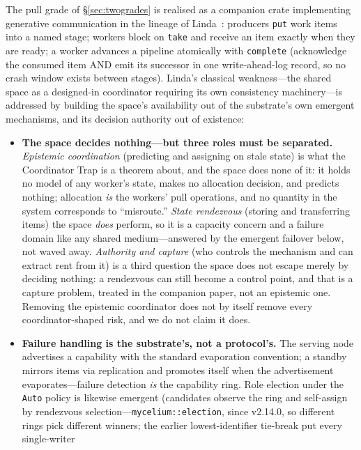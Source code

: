\documentclass[11pt]{article}
\theoremstyle{definition}
\theoremstyle{plain}
\theoremstyle{plain}
\begin{document}
The pull grade of \S\ref{sec:twogrades} is realised as a companion crate
implementing generative communication in the lineage of
Linda~\cite{gelernter1985}: producers \texttt{put} work items into a named
stage; workers block on \texttt{take} and receive an item exactly when
they are ready; a worker advances a pipeline atomically with
\texttt{complete} (acknowledge the consumed item AND emit its successor in
one write-ahead-log record, so no crash window exists between stages).
Linda's classical weakness---the shared space as a designed-in
coordinator requiring its own consistency machinery---is addressed by
building the space's availability out of the substrate's own emergent
mechanisms, and its decision authority out of existence:

\begin{itemize}
\item \textbf{The space decides nothing---but three roles must be
  separated.} \emph{Epistemic coordination} (predicting and assigning on stale
  state) is what the Coordinator Trap is a theorem about, and the space does none of
  it: it holds no model of any worker's state, makes no allocation decision, and
  predicts nothing; allocation \emph{is} the workers' pull operations, and no
  quantity in the system corresponds to ``misroute.'' \emph{State rendezvous}
  (storing and transferring items) the space \emph{does} perform, so it is a capacity
  concern and a failure domain like any shared medium---answered by the emergent
  failover below, not waved away. \emph{Authority and capture} (who controls the
  mechanism and can extract rent from it) is a third question the space does not
  escape merely by deciding nothing: a rendezvous can still become a control point,
  and that is a capture problem, treated in the companion paper, not an epistemic
  one. Removing the epistemic coordinator does not by itself remove every
  coordinator-shaped risk, and we do not claim it does.
\item \textbf{Failure handling is the substrate's, not a protocol's.} The
  serving node advertises a capability with the standard evaporation
  convention; a standby mirrors items via replication and promotes itself
  when the advertisement evaporates---failure detection \emph{is} the
  capability ring. Role election under the \texttt{Auto} policy is
  likewise emergent (candidates observe the ring and self-assign by rendezvous
  selection---\texttt{mycelium::election}, since v2.14.0, so different rings pick
  different winners; the earlier lowest-identifier tie-break put every single-writer

\end{itemize}
\end{document}
